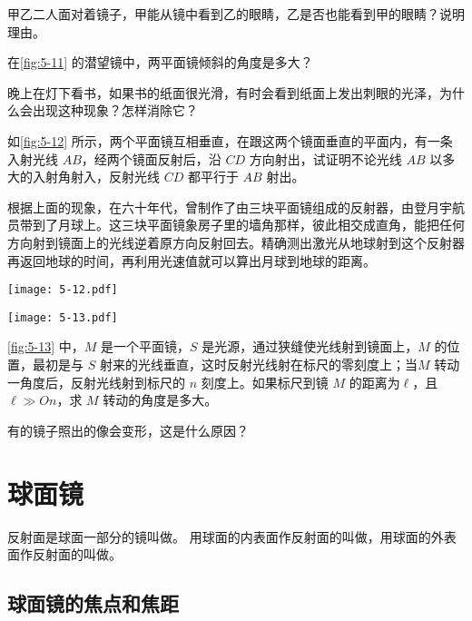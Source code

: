 \begin{Practice}
\begin{question}
  \item 甲乙二人面对着镜子，甲能从镜中看到乙的眼睛，乙是否也能看到甲的眼睛？说明理由。
  \item 在\cref{fig:5-11} 的潜望镜中，两平面镜倾斜的角度是多大？
  \item 晚上在灯下看书，如果书的纸面很光滑，有时会看到纸面上发出刺眼的光泽，为什么会出现这种现象？怎样消除它？
  \item 如\cref{fig:5-12} 所示，两个平面镜互相垂直，在跟这两个镜面垂直的平面内，有一条入射光线 $AB$，经两个镜面反射后，沿 $CD$ 方向射出，试证明不论光线 $AB$ 以多大的入射角射入，反射光线 $CD$ 都平行于 $AB$ 射出。
    
  根据上面的现象，在六十年代，曾制作了由三块平面镜组成的反射器，由登月宇航员带到了月球上。这三块平面镜象房子里的墙角那样，彼此相交成直角，能把任何方向射到镜面上的光线逆着原方向反射回去。精确测出激光从地球射到这个反射器再返回地球的时间，再利用光速值就可以算出月球到地球的距离。
  \begin{figurehere}
    \begin{minipage}[b]{0.46\linewidth}\centering
      \texttt{[image: 5-12.pdf]}
        \caption{}\label{fig:5-12}
    \end{minipage}
    \begin{minipage}[b]{0.50\linewidth}\centering
      \texttt{[image: 5-13.pdf]}
      \caption{}\label{fig:5-13}
    \end{minipage}
  \end{figurehere}
  \item \cref{fig:5-13} 中，$M$ 是一个平面镜，$S$ 是光源，通过狭缝使光线射到镜面上，$M$ 的位置，最初是与 $S$ 射来的光线垂直，这时反射光线射在标尺的零刻度上；当$M$ 转动一角度后，反射光线射到标尺的 $n$ 刻度上。如果标尺到镜 $M$ 的距离为$\ell$，且 $\ell\gg On$，求 $M$ 转动的角度是多大。
  \item 有的镜子照出的像会变形，这是什么原因？
\end{question}
\end{Practice}
    
\section{球面镜}
反射面是球面一部分的镜叫做。
用球面的内表面作反射面的叫做，用球面的外表面作反射面的叫做。

\subsection{球面镜的焦点和焦距}

